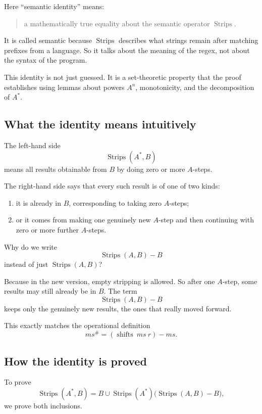 \documentclass[11pt]{article}
\begin{document}
Here ``semantic identity'' means:

\begin{quote}
a mathematically true equality about the semantic operator \(\operatorname{Strips}\).
\end{quote}

It is called semantic because \(\operatorname{Strips}\) describes what strings remain after matching prefixes from a language. So it talks about the meaning of the regex, not about the syntax of the program.

This identity is not just guessed. It is a set-theoretic property that the proof establishes using lemmas about powers \(A^n\), monotonicity, and the decomposition of \(A^*\).

\subsection*{What the identity means intuitively}

The left-hand side
\[
\operatorname{Strips}(A^*,B)
\]
means all results obtainable from \(B\) by doing zero or more \(A\)-steps.

The right-hand side says that every such result is of one of two kinds:

\begin{enumerate}
\item it is already in \(B\), corresponding to taking zero \(A\)-steps;
\item or it comes from making one genuinely new \(A\)-step and then continuing with zero or more further \(A\)-steps.
\end{enumerate}

Why do we write
\[
\operatorname{Strips}(A,B)-B
\]
instead of just \(\operatorname{Strips}(A,B)\)?

Because in the new version, empty stripping is allowed. So after one \(A\)-step, some results may still already be in \(B\). The term
\[
\operatorname{Strips}(A,B)-B
\]
keeps only the genuinely new results, the ones that really moved forward.

This exactly matches the operational definition
\[
ms^\#=(\operatorname{shifts}\ ms\ r)-ms.
\]

\subsection*{How the identity is proved}

To prove
\[
\operatorname{Strips}(A^*,B)
=
B \cup \operatorname{Strips}(A^*)\bigl(\operatorname{Strips}(A,B)-B\bigr),
\]
we prove both inclusions.
\end{document}
